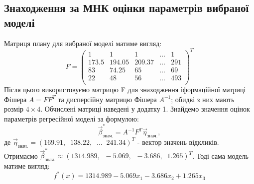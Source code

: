 \documentclass{article}
\begin{document}
    \subsection{Знаходження за МНК оцінки параметрів вибраної моделі}
      Матриця плану для вибраної моделі матиме вигляд:
      \begin{equation}
        F = 
        \begin{pmatrix}
          1 & 1 & 1 & \dots & 1 \\
          173.5 & 194.05 & 209.37 & \dots & 291 \\
          83 & 74.25 & 65 & \dots & 69 \\
          22 & 48 & 56 & \dots & 493 \\
        \end{pmatrix}^T
      \end{equation}
      Після цього використовуємо матрицю F для знаходження іформаційної матриці 
      Фішера $A = FF^T $ та дисперсійну матрицю Фішера $A^{-1}$; обидві з них мають 
      розмір $4 \times 4$.
      Обчислені матриці наведені у додатку 1.
      Знайдемо значення оцінок параметрів регресійної моделі за формулою:
      \begin{equation}
        \vec{\beta}^*_{\text{знач.}} = A^{-1}F^T\vec{\eta}_\text{знач.},
      \end{equation}
      де $\vec{\eta}_\text{знач.} = (169.91, \;\; 138.22, \;\; \dots \;\; 241.34)^T$ - вектор значень 
      відкликів.
      Отримаємо $\vec{\beta}^*_{\text{знач.}} \approx (1314.989, \;\; -5.069, \;\; -3.686, \;\; 1.265)^T$.
      Тоді сама модель матиме вигляд:
      \begin{equation}
        f^*(x) = 1314.989 -5.069 x_1 -3.686 x_2 + 1.265 x_3
      \end{equation}
\end{document}
